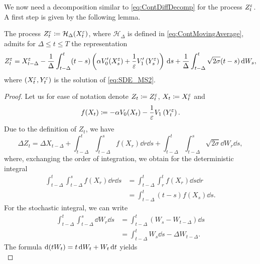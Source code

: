 \documentclass[10pt]{article}
\begin{document}
We now need a decomposition similar to \eqref{eq:ContDiffDecomp} for the process $Z^\varepsilon_t$. A first step is given by the following lemma.
\begin{lemma}\label{lem:ReprMovAv} The process $Z^\varepsilon_t \coloneqq \mathcal H_\Delta(X^\varepsilon_t)$, where $\mathcal H_\Delta$ is defined in \eqref{eq:ContMovingAverage}, admits for $\Delta \leq t \leq T$ the representation
	\begin{equation}
	Z^\varepsilon_t =  X^\varepsilon_{t-\Delta} - \frac1\Delta\int_{t-\Delta}^{t} (t - s) \left( \alpha V_0'(X^\varepsilon_s) + \frac1{\varepsilon} V_1'\left(Y_s^\varepsilon\right)\right) \,\mathrm{d} s + \frac1\Delta \int_{t-\Delta}^{t} \sqrt{2\sigma} (t-s) \,\mathrm{d} W_s,
	\end{equation}
	where $(X_t^\varepsilon, Y_t^\varepsilon)$ is the solution of \eqref{eq:SDE_MS2}.
\end{lemma} 
\begin{proof}
	Let us for ease of notation denote $Z_t \coloneqq Z^\varepsilon_t$, $X_t \coloneqq X^\varepsilon_t$ and 
	\begin{equation}
	f(X_t) \coloneqq -\alpha V_0(X_t) - \frac1{\varepsilon} V_1\left(Y_t^\varepsilon\right).
	\end{equation}
	Due to the definition of $Z_t$, we have
	\begin{equation}\label{eq:ReprStart}
	\Delta Z_t = \Delta X_{t-\Delta} + \int_{t-\Delta}^{t}\int_{t-\Delta}^s f(X_r) \dd r\dd s + \int_{t-\Delta}^{t}\int_{t-\Delta}^s \sqrt{2\sigma}\dd W_r \dd s,
	\end{equation}
	where, exchanging the order of integration, we obtain for the deterministic integral
	\begin{equation}\label{eq:ReprDet}
	\begin{aligned}
	\int_{t-\Delta}^{t}\int_{t-\Delta}^s f(X_r) \dd r\dd s &= \int_{t-\Delta}^{t}\int_r^t f(X_r) \dd s \dd r\\
	&= \int_{t-\Delta}^{t} (t - s) f(X_s) \dd s.
	\end{aligned}
	\end{equation}
	For the stochastic integral, we can write
	\begin{equation}
	\begin{aligned}
	\int_{t-\Delta}^{t}\int_{t-\Delta}^s \dd W_r \dd s &= \int_{t-\Delta}^{t} (W_s - W_{t-\Delta}) \dd s \\
	&= \int_{t-\Delta}^{t} W_s \dd s - \Delta W_{t-\Delta}.
	\end{aligned}
	\end{equation}
	The formula $\mathrm{d}(tW_t) = t\,\mathrm{d} W_t + W_t \,\mathrm{d} t$ yields
	\begin{equation}

\end{equation}
\end{proof}
\end{document}
